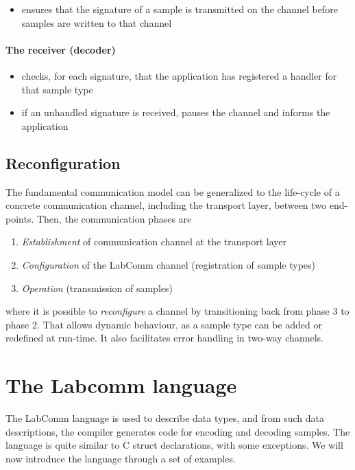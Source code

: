 \documentclass[a4paper]{article}
\begin{document}
\begin{itemize}
 \item ensures that the signature of a sample is transmitted on the channel before samples are 
       written to that channel
\end{itemize}

\paragraph{The receiver (decoder)}

\begin{itemize}
 \item checks, for each signature, that the application has registered a handler for that sample type
 \item if an unhandled signature is received, pauses the channel and informs the application
\end{itemize}

\subsection{Reconfiguration}

The fundamental communication model can be generalized to the life-cycle
of a concrete communication channel, including the transport layer,
between two end-points. Then, the communication phases are
\begin{enumerate}
  \item \emph{Establishment} of communication channel at the transport layer
  \item \emph{Configuration} of the LabComm channel (registration of sample
    types)
  \item \emph{Operation} (transmission of samples)
\end{enumerate}
where it is possible to \emph{reconfigure} a channel by transitioning
back from phase 3 to phase 2. That allows dynamic behaviour, as a sample
type can be added or redefined at run-time. It also facilitates error
handling in two-way channels.

\section{The Labcomm language}

The LabComm language is used to describe data types, and from such data
descriptions, the compiler generates code for encoding and decoding
samples. The language is quite similar to C struct declarations, with
some exceptions. We will now introduce the language through a set of
examples.
\end{document}
